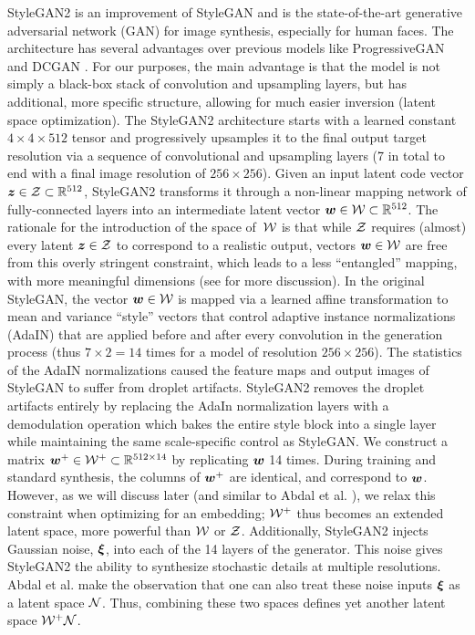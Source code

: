 StyleGAN2 \cite{karras2020analyzing} is an improvement of StyleGAN \cite{karras2019style} and is the state-of-the-art generative adversarial network (GAN) for image synthesis, especially for human faces.
The architecture has several advantages over previous models like ProgressiveGAN \cite{karras2018progressive} and DCGAN \cite{radford2015unsupervised}. For our purposes, the main advantage is that the model is not simply a black-box stack of convolution and upsampling layers, but has additional, more specific structure, allowing for much easier inversion (latent space optimization).
The StyleGAN2 architecture starts with a learned constant $4 \times 4 \times 512$ tensor and progressively upsamples it to the final output target resolution via a sequence of convolutional and upsampling layers (7 in total to end with a final image resolution of $256 \times 256$).
Given an input latent code vector $\bm{z} \in \mathcal{Z} \subset \mathbb{R}^{512}$, StyleGAN2 transforms it through a non-linear mapping network of fully-connected layers into an intermediate latent vector $\bm{w} \in \mathcal{W} \subset \mathbb{R}^{512}$.
The rationale for the introduction of the space of~$\mathcal{W}$ is that while $\mathcal{Z}$ requires (almost) every latent $\bm{z} \in \mathcal{Z}$ to correspond to a realistic output, vectors $\bm{w} \in \mathcal{W}$ are free from this overly stringent constraint, which leads to a less ``entangled'' mapping, with more meaningful dimensions (see \cite{karras2019style,karras2020analyzing} for more discussion).
In the original StyleGAN, the vector $\bm{w} \in \mathcal{W}$ is mapped via a learned affine transformation to mean and variance ``style'' vectors that control adaptive instance normalizations (AdaIN) \cite{huang2017arbitrary} that are applied before and after every convolution in the generation process (thus $7 \times 2 = 14$ times for a model of resolution $256 \times 256$). The statistics of the AdaIN normalizations caused the feature maps and output images of StyleGAN to suffer from droplet artifacts. StyleGAN2 removes the droplet artifacts entirely by replacing the AdaIn normalization layers with a demodulation operation which bakes the entire style block into a single layer while maintaining the same scale-specific control as StyleGAN.
We construct a matrix $\bm{w}^+ \in \mathcal{W}^+ \subset \mathbb{R}^{512 \times 14}$ by replicating $\bm{w}$ 14 times.
During training and standard synthesis, the columns of $\bm{w}^+$ are identical, and correspond to $\bm{w}$.
However, as we will discuss later (and similar to Abdal et al. \cite{abdal2019image2stylegan}), we relax this constraint when optimizing for an embedding; $\mathcal{W}^+$ thus becomes an extended latent space, more powerful than $\mathcal{W}$ or $\mathcal{Z}$.
Additionally, StyleGAN2 injects Gaussian noise, $\bm{\xi}$, into each of the 14 layers of the generator.
This noise gives StyleGAN2 the ability to synthesize stochastic details at multiple resolutions.
Abdal et al. \cite{abdal2020image2stylegan++} make the observation that one can also treat these noise inputs $\bm{\xi}$ as a latent space $\mathcal{N}$. Thus, combining these two spaces defines yet another latent space $\mathcal{W}^+\mathcal{N}$.


